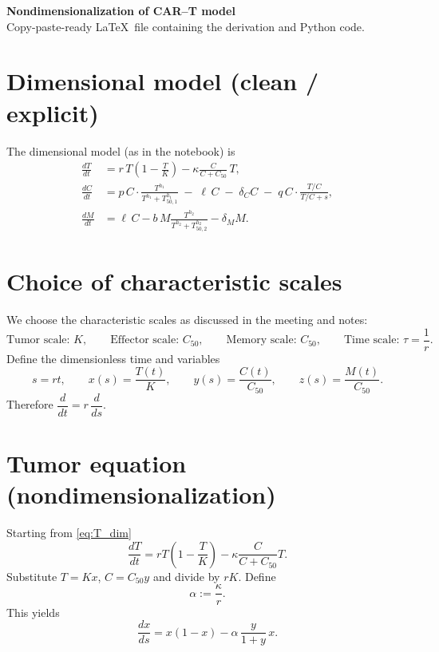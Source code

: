 \documentclass[11pt]{article}
\begin{document}
\begin{center}
    {\LARGE \textbf{Nondimensionalization of CAR--T model}}\\[6pt]
    \small Copy-paste-ready \LaTeX\ file containing the derivation and Python code.
\end{center}

\bigskip

\section*{Dimensional model (clean / explicit)}
The dimensional model (as in the notebook) is
\begin{align}
\frac{dT}{dt} &= r\,T\!\left(1-\frac{T}{K}\right) - \kappa\frac{C}{C+C_{50}}\,T,
\label{eq:T_dim}\\[6pt]
\frac{dC}{dt} &= p\,C\cdot\frac{T^{h_1}}{T^{h_1}+T_{50,1}^{h_1}}
\;-\; \ell\,C \;-\; \delta_C C \;-\; q\,C\cdot\frac{T/C}{T/C + s},
\label{eq:C_dim}\\[6pt]
\frac{dM}{dt} &= \ell\,C - b\,M\frac{T^{h_2}}{T^{h_2}+T_{50,2}^{h_2}} - \delta_M M.
\label{eq:M_dim}
\end{align}

\medskip

\section*{Choice of characteristic scales}
We choose the characteristic scales as discussed in the meeting and notes:
\[
\text{Tumor scale: } K,\qquad
\text{Effector scale: } C_{50},\qquad
\text{Memory scale: } C_{50},\qquad
\text{Time scale: } \tau = \frac{1}{r}.
\]
Define the dimensionless time and variables
\[
s = r t,\qquad
x(s)=\frac{T(t)}{K},\qquad
y(s)=\frac{C(t)}{C_{50}},\qquad
z(s)=\frac{M(t)}{C_{50}}.
\]
Therefore \(\dfrac{d}{dt} = r\,\dfrac{d}{ds}\).

\bigskip

\section*{Tumor equation (nondimensionalization)}
Starting from \eqref{eq:T_dim}
\[
\frac{dT}{dt} = rT\left(1-\frac{T}{K}\right) - \kappa\frac{C}{C + C_{50}}T.
\]
Substitute \(T=Kx\), \(C=C_{50}y\) and divide by \(rK\). Define
\[
\alpha := \frac{\kappa}{r}.
\]
This yields
\[
\boxed{\displaystyle \frac{dx}{ds} = x(1-x) - \alpha\,\frac{y}{1+y}\,x.}
\]

\bigskip
\end{document}
